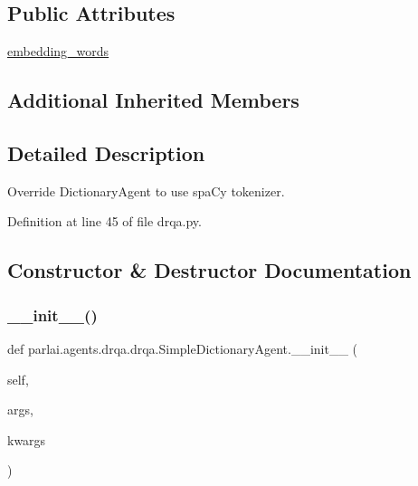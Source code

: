 \subsection*{Public Attributes}
\begin{DoxyCompactItemize}
\item 
\hyperlink{classparlai_1_1agents_1_1drqa_1_1drqa_1_1SimpleDictionaryAgent_a26ce0c0cc3362b43219d488826c3550a}{embedding\+\_\+words}
\end{DoxyCompactItemize}
\subsection*{Additional Inherited Members}


\subsection{Detailed Description}
\begin{DoxyVerb}Override DictionaryAgent to use spaCy tokenizer.\end{DoxyVerb}
 

Definition at line 45 of file drqa.\+py.



\subsection{Constructor \& Destructor Documentation}
\mbox{\label{classparlai_1_1agents_1_1drqa_1_1drqa_1_1SimpleDictionaryAgent_ae21eeff2d5a918998ca8ea90279c9b07}} 
\subsubsection{\texorpdfstring{\+\_\+\+\_\+init\+\_\+\+\_\+()}{\_\_init\_\_()}}
{\footnotesize\ttfamily def parlai.\+agents.\+drqa.\+drqa.\+Simple\+Dictionary\+Agent.\+\_\+\+\_\+init\+\_\+\+\_\+ (\begin{DoxyParamCaption}\item[{}]{self,  }\item[{}]{args,  }\item[{}]{kwargs }\end{DoxyParamCaption})}



